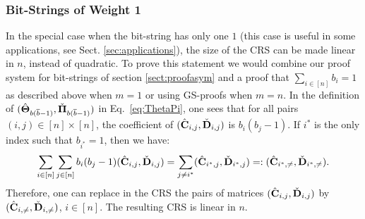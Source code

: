\subsubsection{Bit-Strings of Weight 1}  In the special
case when the bit-string has only one $1$ (this case is useful in some applications, see Sect. \ref{sec:applications}),  the size of the CRS can be made linear in $n$, instead of quadratic.
To prove this statement we would combine our proof system for bit-strings of section \ref{sect:proofasym} and a proof that  $\sum_{i \in [n]} b_i=1$ as described above
when $m=1$ or using GS-proofs when $m=n$.
In the definition of $({\hat{\mathbf{{\Theta}}}}_{b(\overline{b}-1)},\check{\mathbf{{\Pi}}}_{b(\overline{b}-1)})$ in Eq.~\ref{eq:ThetaPi}, one 
sees that for all pairs $(i,j) \in [n] \times [n]$, the coefficient of $({\hat{\mathbf{C}}}_{i,j},\check{\mathbf{D}}_{i,j})$ is $b_i(b_j-1)$.
If $i^*$ is the only index such that $b_{i^*}=1$, then we have:
$$\sum_{i \in [n]} \sum_{j \in [n]} b_i(b_j-1) ({\hat{\mathbf{C}}}_{i,j},\check{\mathbf{D}}_{i,j}) = \sum_{j \neq i^*} ({\hat{\mathbf{C}}}_{i^*,j},\check{\mathbf{D}}_{i^*,j})=: ({\hat{\mathbf{C}}}_{i^*,\neq},\check{\mathbf{D}}_{i^*,\neq}).$$
Therefore, one can replace in the CRS the pairs of matrices  $ ({\hat{\mathbf{C}}}_{i,j},\check{\mathbf{D}}_{i,j})$ by  $({\hat{\mathbf{C}}}_{i,\neq},\check{\mathbf{D}}_{i,\neq})$, $i \in [n]$. The resulting CRS is linear in $n$.

